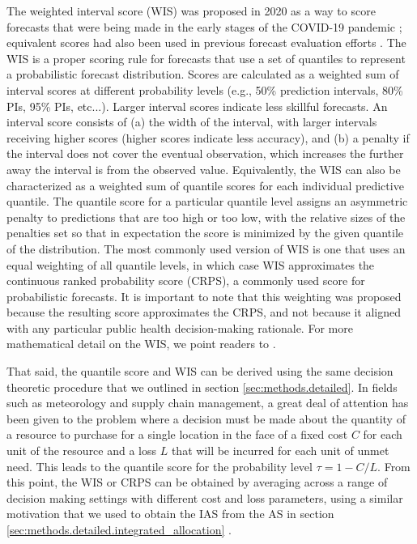 \documentclass{article}\usepackage[]{graphicx}\usepackage[]{xcolor}
\begin{document}
The weighted interval score (WIS) was proposed in 2020 as a way to score forecasts that were being made in the early
stages of the COVID-19 pandemic \citep{bracher2021evaluating}; equivalent scores had also been used in previous forecast
evaluation efforts \cite[e.g.,][]{hong2016probabilisticEnergyForecasting}. The WIS is a proper scoring rule for
forecasts that use a set of quantiles to represent a probabilistic forecast distribution. Scores are calculated as a weighted sum of
interval scores at different probability levels (e.g., 50\% prediction intervals, 80\% PIs, 95\% PIs, etc...). Larger
interval scores indicate less skillful forecasts. An interval score consists of (a) the width of the interval, with
larger intervals receiving higher scores (higher scores indicate less accuracy), and (b) a penalty if the interval does
not cover the eventual observation, which increases the further away the interval is from the observed value.
Equivalently, the WIS can also be characterized as a weighted sum of quantile scores for each individual predictive
quantile. The quantile score for a particular quantile level assigns an asymmetric penalty to predictions that are too
high or too low, with the relative sizes of the penalties set so that in expectation the score is minimized by the given
quantile of the distribution. The most commonly used version of WIS is one that uses an equal weighting of all quantile
levels, in which case WIS approximates the continuous ranked probability score (CRPS), a commonly used score for
probabilistic forecasts. It is important to note that this weighting was proposed because the resulting score
approximates the CRPS, and not because it aligned with any particular public health decision-making rationale. For more mathematical detail on the WIS, we point readers to \cite{bracher2021evaluating}.

That said, the quantile score and WIS can be derived using the same decision theoretic procedure that we outlined in
section \ref{sec:methods.detailed}. In fields such as meteorology and supply chain management, a great deal of attention
has been given to the problem where a decision must be made about the quantity of a resource to purchase for a single
location in the face of a fixed cost $C$ for each unit of the resource and a loss $L$ that will be incurred for each
unit of unmet need. This leads to the quantile score for the probability level $\tau = 1 - C/L$. From this point, the
WIS or CRPS can be obtained by averaging across a range of decision making settings with different cost and loss
parameters, using a similar motivation that we used to obtain the IAS from the AS in section
\ref{sec:methods.detailed.integrated_allocation} \citep{gneiting2011weightedScoringRules}.
\end{document}
